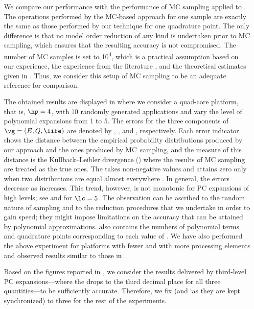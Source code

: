 We compare our performance with the performance of \ac{MC} sampling applied to
. The operations performed by the
\ac{MC}-based approach for one sample are exactly the same as those performed by
our technique for one quadrature point. The only difference is that no model
order reduction of any kind is undertaken prior to \ac{MC} sampling, which
ensures that the resulting accuracy is not compromised. The number of \ac{MC}
samples is set to 10\textsuperscript{4}, which is a practical assumption based
on our experience, the experience from the literature \cite{xiang2010, juan2012,
lee2013}, and the theoretical estimates given in \cite{diaz-emparanza2002}.
Thus, we consider this setup of \ac{MC} sampling to be an adequate reference for
comparison.

The obtained results are displayed in  where
we consider a quad-core platform, that is, $\np = 4$, with 10 randomly generated
applications and vary the level of polynomial expansions \lc from 1 to 5. The
errors for the three components of $\vg = (E, Q, \life)$ are denoted by
, , and \error{\life}, respectively. Each error indicator
shows the distance between the empirical probability distributions produced by
our approach and the ones produced by \ac{MC}\ sampling, and the measure of this
distance is the Kullback--Leibler divergence () \cite{gelman2013,
hastie2013} where the results of \ac{MC} sampling are treated as the true ones.
The  takes non-negative values and attains zero only when two
distributions are equal almost everywhere \cite{durrett2010}. In general, the
errors decrease as \lc increases. This trend, however, is not monotonic for
\ac{PC} expansions of high levels; see  and \error{\life} for $\lc =
5$. The observation can be ascribed to the random nature of sampling and to the
reduction procedures that we undertake in order to gain speed; they might impose
limitations on the accuracy that can be attained by polynomial approximations.
 also contains the numbers of polynomial terms
\nc and quadrature points \nq corresponding to each value of \lc. We have also
performed the above experiment for platforms with fewer and with more processing
elements and observed results similar to those in
.

Based on the figures reported in , we consider
the results delivered by third-level \ac{PC} expansions---where the 
drops to the third decimal place for all three quantities---to be sufficiently
accurate. Therefore, we fix \lc (and \lq as they are kept synchronized) to three
for the rest of the experiments.

